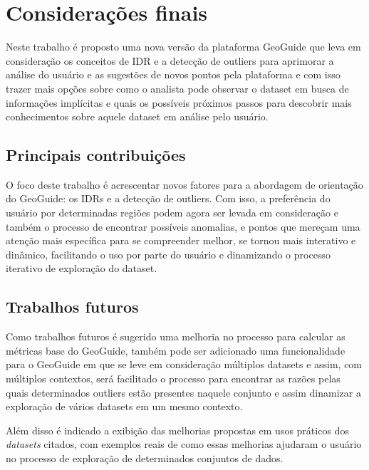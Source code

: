 \chapter{Considerações finais}
\label{chap:consideracoes}

Neste trabalho é proposto uma nova versão da plataforma GeoGuide \cite{omidvarTehrani2017} que leva em consideração os conceitos de IDR e a detecção de outliers para aprimorar a análise do usuário e as sugestões de novos pontos pela plataforma e com isso trazer mais opções sobre como o analista pode observar o dataset em busca de informações implícitas e quais os possíveis próximos passos para descobrir mais conhecimentos sobre aquele dataset em análise pelo usuário.

\section{Principais contribuições}

O foco deste trabalho é acrescentar novos fatores para a abordagem de orientação do GeoGuide: os IDRs e a detecção de outliers. Com isso, a preferência do usuário por determinadas regiões podem agora ser levada em consideração e também o processo de encontrar possíveis anomalias, e pontos que mereçam uma atenção mais específica para se compreender melhor, se tornou mais interativo e dinâmico, facilitando o uso por parte do usuário e dinamizando o processo iterativo de exploração do dataset.

\section{Trabalhos futuros}

Como trabalhos futuros é sugerido uma melhoria no processo para calcular as métricas base do GeoGuide, também pode ser adicionado uma funcionalidade para o GeoGuide em que se leve em consideração múltiplos datasets e assim, com múltiplos contextos, será facilitado o processo para encontrar as razões pelas quais determinados outliers estão presentes naquele conjunto e assim dinamizar a exploração de vários datasets em um mesmo contexto. 

Além disso é indicado a exibição das melhorias propostas em usos práticos dos \textit{datasets} citados, com exemplos reais de como essas melhorias ajudaram o usuário no processo de exploração de determinados conjuntos de dados.